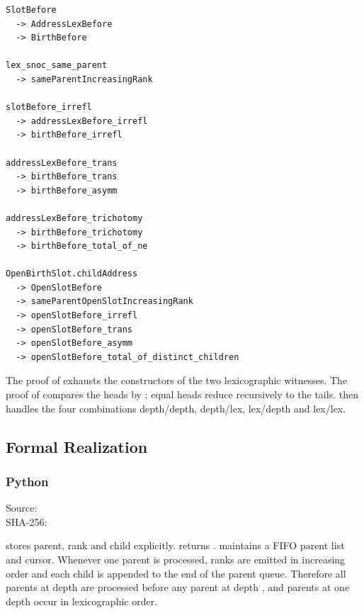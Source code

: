 \begin{verbatim}
SlotBefore
  -> AddressLexBefore
  -> BirthBefore

lex_snoc_same_parent
  -> sameParentIncreasingRank

slotBefore_irrefl
  -> addressLexBefore_irrefl
  -> birthBefore_irrefl

addressLexBefore_trans
  -> birthBefore_trans
  -> birthBefore_asymm

addressLexBefore_trichotomy
  -> birthBefore_trichotomy
  -> birthBefore_total_of_ne

OpenBirthSlot.childAddress
  -> OpenSlotBefore
  -> sameParentOpenSlotIncreasingRank
  -> openSlotBefore_irrefl
  -> openSlotBefore_trans
  -> openSlotBefore_asymm
  -> openSlotBefore_total_of_distinct_children
\end{verbatim}

The proof of \texttt{\protect{}} exhausts the constructors
of the two lexicographic witnesses. The proof of
\texttt{\protect{}} compares the heads by
\texttt{\protect{}}; equal heads reduce recursively to the
tails. \texttt{\protect{}} then handles the four combinations
depth/depth, depth/lex, lex/depth and lex/lex.

\subsection{Formal Realization}\label{formal-realization}

\subsubsection{Python}\label{python}

Source:
\texttt{\protect{}}\\
SHA-256:
\texttt{\protect{}}

\texttt{\protect{}} stores parent, rank and child explicitly.
\texttt{\protect{}} returns \texttt{\protect{}}.
\texttt{\protect{}} maintains a FIFO parent list and
cursor. Whenever one parent is processed, ranks are emitted in
increasing order and each child is appended to the end of the parent
queue. Therefore all parents at depth \texttt{\protect{}} are processed before
any parent at depth \texttt{\protect{}}, and parents at one depth occur in
lexicographic order.


